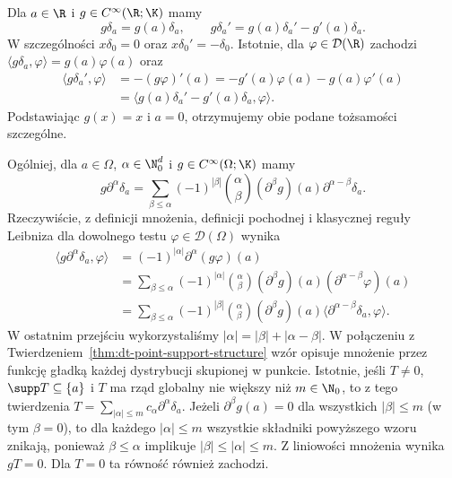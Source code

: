 \begin{przyklad}
\label{ex:multiply-delta20}
Dla $a\in\R$ i $g\in C^\infty(\R;\K)$ mamy
\[
 g\delta_a=g(a)\delta_a,\qquad
 g\delta_a'=g(a)\delta_a'-g'(a)\delta_a.
\]
W szczególności $x\delta_0=0$ oraz $x\delta_0'=-\delta_0$.
Istotnie, dla $\varphi\in\mathcal D(\R)$ zachodzi
$\langle g\delta_a,\varphi\rangle=g(a)\varphi(a)$ oraz
\[
\begin{aligned}
\langle g\delta_a',\varphi\rangle
&=-(g\varphi)'(a)=-g'(a)\varphi(a)-g(a)\varphi'(a)\\
&=\langle g(a)\delta_a'-g'(a)\delta_a,\varphi\rangle.
\end{aligned}
\]
Podstawiając $g(x)=x$ i $a=0$, otrzymujemy obie
podane tożsamości szczególne.

Ogólniej, dla $a\in\Omega$, $\alpha\in\N_0^d$
i $g\in C^\infty(\Omega;\K)$ mamy
\[
 g\partial^\alpha\delta_a
 =\sum_{\beta\le\alpha}(-1)^{|\beta|}
 \binom{\alpha}{\beta}(\partial^\beta g)(a)
 \partial^{\alpha-\beta}\delta_a.
\]
Rzeczywiście, z definicji mnożenia, definicji pochodnej
i klasycznej reguły Leibniza dla dowolnego testu
$\varphi\in\mathcal D(\Omega)$ wynika
\[
\begin{aligned}
 \langle g\partial^\alpha\delta_a,\varphi\rangle
 &=(-1)^{|\alpha|}\partial^\alpha(g\varphi)(a)\\
 &=\sum_{\beta\le\alpha}(-1)^{|\alpha|}
  \binom{\alpha}{\beta}
  (\partial^\beta g)(a)(\partial^{\alpha-\beta}\varphi)(a)\\
 &=\sum_{\beta\le\alpha}(-1)^{|\beta|}
  \binom{\alpha}{\beta}(\partial^\beta g)(a)
  \langle\partial^{\alpha-\beta}\delta_a,\varphi\rangle.
\end{aligned}
\]
W ostatnim przejściu wykorzystaliśmy
$|\alpha|=|\beta|+|\alpha-\beta|$.
W połączeniu z Twierdzeniem~\ref{thm:dt-point-support-structure}
wzór opisuje mnożenie przez funkcję gładką każdej
dystrybucji skupionej w punkcie. Istotnie, jeśli
$T\ne0$, $\supp T\subseteq\{a\}$ i $T$ ma rząd globalny
nie większy niż $m\in\N_0$, to z tego twierdzenia
$T=\sum_{|\alpha|\le m}c_\alpha\partial^\alpha\delta_a$.
Jeżeli $\partial^\beta g(a)=0$ dla wszystkich
$|\beta|\le m$ (w tym $\beta=0$), to dla każdego
$|\alpha|\le m$ wszystkie składniki powyższego wzoru
znikają, ponieważ $\beta\le\alpha$ implikuje
$|\beta|\le|\alpha|\le m$. Z liniowości mnożenia
wynika $gT=0$. Dla $T=0$ ta równość również zachodzi.
\end{przyklad}

